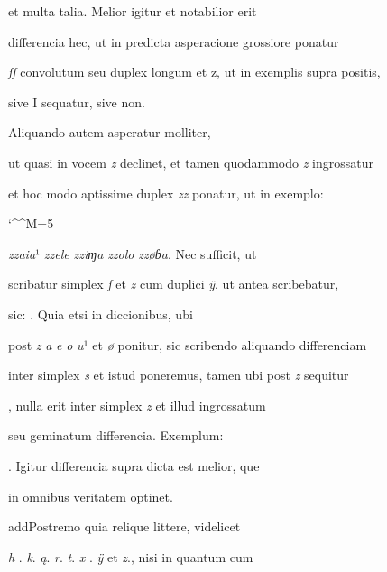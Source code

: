 et multa talia. Melior igitur et notabilior erit 

differencia hec, ut in predicta asperacione grossiore ponatur 

\textit{ſſ} convolutum seu duplex longum et z, ut in exemplis supra positis, 

\splitlines

sive I sequatur, sive non.

\indentK Aliquando autem asperatur molliter, 

\fulllines

ut quasi in vocem \textit{z} declinet, et tamen quodammodo \textit{z} ingrossatur 

et hoc modo aptissime duplex \textit{zz} ponatur, ut in exemplo: 

\catcode `\^^M=5
\obeylines

\textit{zzaia}¹ \textit{zzele} \textit{zziɱa} \textit{zzolo} \textit{zzøɓa}. Nec sufficit, ut 


scribatur simplex \textit{ſ} et \textit{z} cum duplici \textit{ÿ}, ut antea scribebatur, 

sic:  . Quia etsi in diccionibus, ubi 

post \textit{z} \textit{a} \textit{e} \textit{o} \textit{u}¹ et \textit{ø} ponitur, sic scribendo aliquando differenciam 

inter simplex \textit{s} et istud poneremus, tamen ubi post \textit{z} sequitur 

, nulla erit inter simplex \textit{z} et illud ingrossatum

seu geminatum differencia. Exemplum:   

. Igitur differencia 
supra dicta est melior, que 

in omnibus veritatem optinet. 

\indentP add{P}ostremo quia relique littere, videlicet 

\textit{h} . \textit{k}. \textit{ą}. \textit{r}. \textit{t}. \textit{x} . \textit{ÿ} et \textit{z}., nisi in quantum cum 

